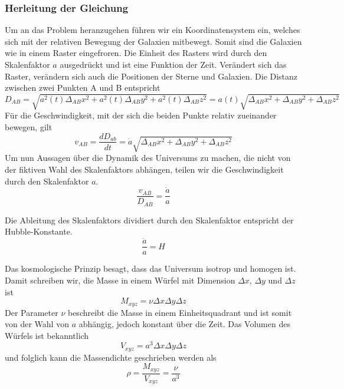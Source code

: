\begin{refsection}
\subsubsection{Herleitung der Gleichung}
Um an das Problem heranzugehen führen wir ein Koordinatensystem ein, welches sich mit der relativen Bewegung der Galaxien mitbewegt. Somit sind die Galaxien wie in einem Raster eingefroren. Die Einheit des Rasters wird durch den Skalenfaktor $a$ ausgedrückt und ist eine Funktion der Zeit. Verändert sich das Raster, verändern sich auch die Positionen der Sterne und Galaxien.
Die Distanz zwischen zwei Punkten A und B entspricht 
\begin{equation}
D_{AB} = \sqrt{a^2(t)\Delta_{AB}x^2 + a^2(t)\Delta_{AB}y^2 + a^2(t)\Delta_{AB}z^2} = a(t) \sqrt{\Delta_{AB}x^2 + \Delta_{AB}y^2 + \Delta_{AB}z^2}
\end{equation}
F\"{u}r die Geschwindigkeit, mit der sich die beiden Punkte relativ zueinander bewegen, gilt 
\begin{equation}
v_{AB} = \dfrac{dD_{ab}}{dt} 
	   = \dot{a} \sqrt{\Delta_{AB}x^2 + \Delta_{AB}y^2 + \Delta_{AB}z^2}
\end{equation}
Um nun Aussagen über die Dynamik des Universums zu machen, die nicht von der fiktiven Wahl  des Skalenfaktors abhängen, teilen wir die Geschwindigkeit durch den Skalenfaktor $a$.
\begin{equation}
\frac{v_{AB} }{D_{AB}} = \frac{\dot{a}}{a}
\label{friedmann:geschwindigkeit}
\end{equation}
\begin{satz} 
	Die Ableitung des Skalenfaktors dividiert durch den Skalenfaktor entspricht der Hubble-Konstante.
	\[
	\frac{\dot{a}}{a} = H
	\]
\end{satz}
Das kosmologische Prinzip besagt, dass das Universum isotrop und homogen ist. Damit schreiben wir, die Masse in einem Würfel mit Dimension $\Delta x$, $\Delta y$ und $\Delta z$ ist
\begin{equation}
M_{xyz} = \nu \Delta x \Delta y \Delta z
\end{equation}
Der Parameter $\nu$ beschreibt die Masse in einem Einheitsquadrant und ist somit von der Wahl von $a$ abhängig, jedoch konstant über die Zeit. Das Volumen des Würfels ist bekanntlich 
\begin{equation}
V_{xyz} = a^3 \Delta x \Delta y \Delta z
\end{equation}
und folglich kann die Massendichte geschrieben werden als
\begin{equation}
\rho = \frac{M_{xyz}}{V_{xyz}} = \frac{\nu}{a^3}
\label{friedmann:dichte}
\end{equation}

\end{refsection}
